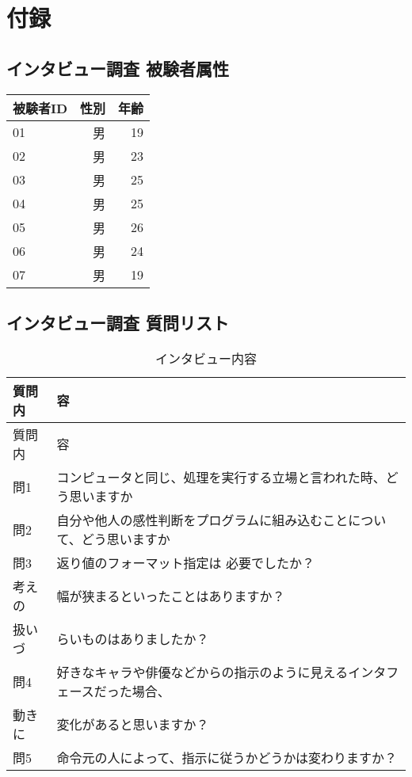 \chapter{付録}\label{chap:appendix}

\section{インタビュー調査
被験者属性}\label{ux30a4ux30f3ux30bfux30d3ux30e5ux30fcux8abfux67fb-ux88abux9a13ux8005ux5c5eux6027}

\begin{longtable}[c]{@{}lrr@{}}
\toprule
被験者ID & 性別 & 年齢\tabularnewline
\midrule
\endhead
01 & 男 & 19\tabularnewline
02 & 男 & 23\tabularnewline
03 & 男 & 25\tabularnewline
04 & 男 & 25\tabularnewline
05 & 男 & 26\tabularnewline
06 & 男 & 24\tabularnewline
07 & 男 & 19\tabularnewline
\bottomrule
\end{longtable}

\section{インタビュー調査
質問リスト}\label{ux30a4ux30f3ux30bfux30d3ux30e5ux30fcux8abfux67fb-ux8ceaux554fux30eaux30b9ux30c8}

\begin{longtable}[c]{@{}ll@{}}
\caption{インタビュー内容 \label{table:interview}}\tabularnewline
\toprule
質問内 & 容\tabularnewline
\midrule
\endfirsthead
\toprule
質問内 & 容\tabularnewline
\midrule
\endhead
問1 &
コンピュータと同じ、処理を実行する立場と言われた時、どう思いますか\tabularnewline
問2 &
自分や他人の感性判断をプログラムに組み込むことについて、どう思いますか\tabularnewline
問3 & 返り値のフォーマット指定は 必要でしたか？ \tabularnewline
考えの & 幅が狭まるといったことはありますか？ \tabularnewline
扱いづ & らいものはありましたか？\tabularnewline
問4 &
好きなキャラや俳優などからの指示のように見えるインタフェースだった場合、\tabularnewline
動きに & 変化があると思いますか？\tabularnewline
問5 &
命令元の人によって、指示に従うかどうかは変わりますか？\tabularnewline
\bottomrule
\end{longtable}
